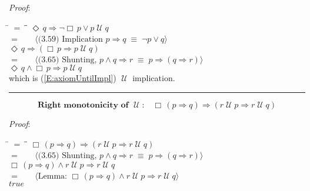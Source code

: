 \documentclass[12pt, fleqn, leqno]{article}
\newcommand{\lgap}{2pt}                             %
\newcommand{\mymathindent}{24pt}                    %
\newcommand{\equivs}{\ensuremath{\;\equiv\;}}       %
\newcommand{\impl}{\ensuremath{\Rightarrow}}        %
\newcommand{\Until}{\;\mathcal{U}\;}
\newcommand{\Event}{\Diamond\,}
\newcommand{\Always}{\Box\,}
\newcommand{\myqed}{\rule[-.23ex]{1.2ex}{2.0ex}}
\newcommand{\myqedtab}{\hspace{384pt}}              %
\newcommand{\Gll} {\langle}                         %
\newcommand{\Ggg} {\rangle}                         %
\newcommand{\Hint}[1]     {\ \ \ $\Gll              \mbox{#1} \Ggg$ }   %
\begin{document}
\emph{Proof}:
\begin{tabbing}
\hspace{\mymathindent} \= $= \;$ \= \myqedtab \= \kill
\> \> $\Event q\impl \neg\Always p\lor p \Until q$\\[\lgap]
\> $=$  \>  \Hint{(3.59) Implication $p\impl q \equivs \neg p \lor q$}\\[\lgap]
\> \> $\Event q\impl (\Always p\impl p \Until q)$\\[\lgap]
\> $=$  \>  \Hint{(3.65) Shunting, $p\land q \impl r \equivs p \impl (q \impl r)$}\\[\lgap]
\> \> $\Event q\land \Always p\impl p \Until q$\\[\lgap]
\> which is (\ref{E:axiomUntilImpl}) $\Until$ implication. \quad \myqed
\end{tabbing}
\begin{equation}\label{E:rightMonoUntil}
\textbf{Right monotonicity of $\Until$:}\quad \Always (p \impl q) \impl (r \Until p \impl r \Until q)
\end{equation}

\emph{Proof}:
\begin{tabbing}
\hspace{\mymathindent} \= $= \;$ \= \myqedtab \= \kill
  \> \>   $\Always (p \impl q) \impl (r \Until p \impl r \Until q)$\\[\lgap]
  \> $=$  \>  \Hint{(3.65) Shunting, $p\land q \impl r \equivs p \impl (q \impl r)$}\\[\lgap]
  \> \>   $\Always (p \impl q) \land r \Until p \impl r \Until q$\\[\lgap]
  \> $=$  \>  \Hint{Lemma: $\Always (p \impl q) \land r \Until p \impl r \Until q$}\\[\lgap]
  \> \>   $true$
\end{tabbing}
\end{document}
